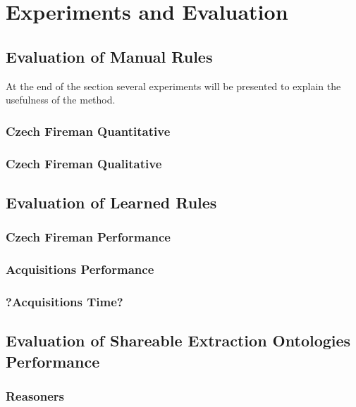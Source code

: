 \chapter{Experiments and Evaluation} \label{sec:ch_eval}

\section{Evaluation of Manual Rules}

At the end of the section several experiments will be presented to explain the usefulness of the method. 

\subsection{Czech Fireman Quantitative}

\subsection{Czech Fireman Qualitative}

\section{Evaluation of Learned Rules}

\subsection{Czech Fireman Performance}

\subsection{Acquisitions Performance}

\subsection{?Acquisitions Time?}

\section{Evaluation of Shareable Extraction Ontologies Performance} \label{sec:eval_Shareable_Extraction_Ontologies}

\subsection{Reasoners}

